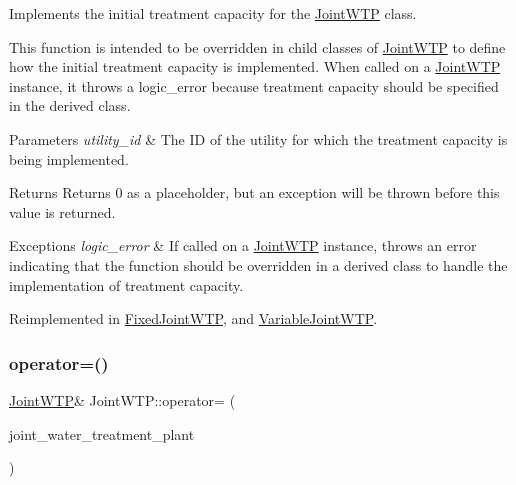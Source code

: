 Implements the initial treatment capacity for the \mbox{\hyperlink{classJointWTP}{Joint\+W\+TP}} class. 

This function is intended to be overridden in child classes of {\ttfamily \mbox{\hyperlink{classJointWTP}{Joint\+W\+TP}}} to define how the initial treatment capacity is implemented. When called on a {\ttfamily \mbox{\hyperlink{classJointWTP}{Joint\+W\+TP}}} instance, it throws a {\ttfamily logic\+\_\+error} because treatment capacity should be specified in the derived class.


\begin{DoxyParams}{Parameters}
{\em utility\+\_\+id} & The ID of the utility for which the treatment capacity is being implemented.\\
\hline
\end{DoxyParams}
\begin{DoxyReturn}{Returns}
Returns 0 as a placeholder, but an exception will be thrown before this value is returned. 
\end{DoxyReturn}

\begin{DoxyExceptions}{Exceptions}
{\em logic\+\_\+error} & If called on a {\ttfamily \mbox{\hyperlink{classJointWTP}{Joint\+W\+TP}}} instance, throws an error indicating that the function should be overridden in a derived class to handle the implementation of treatment capacity. \\
\hline
\end{DoxyExceptions}


Reimplemented in \mbox{\hyperlink{classFixedJointWTP_a0874b64a650c002d7230bd95bc4817ef}{Fixed\+Joint\+W\+TP}}, and \mbox{\hyperlink{classVariableJointWTP_ade062353af947456c6a3ed10a93686d4}{Variable\+Joint\+W\+TP}}.

\mbox{\label{classJointWTP_a00f348852618d93725c6c83bac49bf00}} 
\subsubsection{\texorpdfstring{operator=()}{operator=()}}
{\footnotesize\ttfamily \mbox{\hyperlink{classJointWTP}{Joint\+W\+TP}}\& Joint\+W\+T\+P\+::operator= (\begin{DoxyParamCaption}\item[{const \mbox{\hyperlink{classJointWTP}{Joint\+W\+TP}} \&}]{joint\+\_\+water\+\_\+treatment\+\_\+plant }\end{DoxyParamCaption})}



